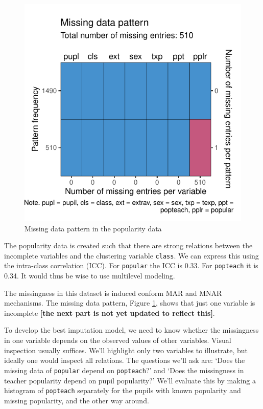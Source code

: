 \documentclass[
]{jss}
\begin{document}
\begin{CodeChunk}
\begin{figure}

{\centering \includegraphics{Manuscript_files/figure-latex/pop_pat-1} 

}

\caption[Missing data pattern in the popularity data]{Missing data pattern in the popularity data}\label{fig:pop_pat}
\end{figure}
\end{CodeChunk}

The popularity data is created such that there are strong relations
between the incomplete variables and the clustering variable
\texttt{class}. We can express this using the intra-class correlation
(ICC). For \texttt{popular} the ICC is 0.33. For \texttt{popteach} it is
0.34. It would thus be wise to use multilevel modeling.

The missingness in this dataset is induced conform MAR and MNAR
mechanisms. The missing data pattern, Figure \ref{fig:pop_pat}, shows
that just one variable is incomplete \textbf{{[}the next part is not yet
updated to reflect this{]}}.

To develop the best imputation model, we need to know whether the
missingness in one variable depends on the observed values of other
variables. Visual inspection usually suffices. We'll highlight only two
variables to illustrate, but ideally one would inspect all relations.
The questions we'll ask are: `Does the missing data of \texttt{popular}
depend on \texttt{popteach}?' and `Does the missingness in teacher
popularity depend on pupil popularity?' We'll evaluate this by making a
histogram of \texttt{popteach} separately for the pupils with known
popularity and missing popularity, and the other way around.
\end{document}
